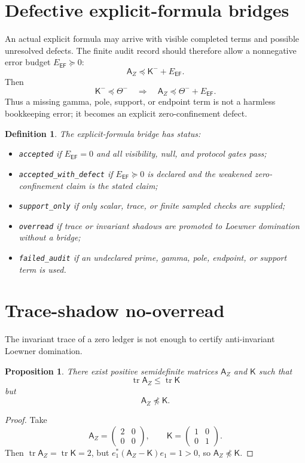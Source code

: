 \documentclass[11pt]{article}
\newtheorem{proposition}[theorem]{Proposition}
\newtheorem{definition}[theorem]{Definition}
\DeclareMathOperator{\tr}{tr}
\newcommand{\Kmat}{\mathsf K}
\newcommand{\AZ}{\mathsf A_Z}
\newcommand{\EF}{\mathsf{EF}}
\begin{document}
\section{Defective explicit-formula bridges}
An actual explicit formula may arrive with visible completed terms and possible unresolved defects.  The finite audit record should therefore allow a nonnegative error budget $E_{\EF}\succeq0$:
\[
  \AZ\preceq \Kmat^- + E_{\EF}.
\]
Then
\[
  \Kmat^-\preceq\Theta^-
  \quad\Longrightarrow\quad
  \AZ\preceq\Theta^-+E_{\EF}.
\]
Thus a missing gamma, pole, support, or endpoint term is not a harmless bookkeeping error; it becomes an explicit zero-confinement defect.

\begin{definition}
The explicit-formula bridge has status:
\begin{itemize}
  \item \texttt{accepted} if $E_{\EF}=0$ and all visibility, null, and protocol gates pass;
  \item \texttt{accepted\_with\_defect} if $E_{\EF}\succeq0$ is declared and the weakened zero-confinement claim is the stated claim;
  \item \texttt{support\_only} if only scalar, trace, or finite sampled checks are supplied;
  \item \texttt{overread} if trace or invariant shadows are promoted to Loewner domination without a bridge;
  \item \texttt{failed\_audit} if an undeclared prime, gamma, pole, endpoint, or support term is used.
\end{itemize}
\end{definition}

\section{Trace-shadow no-overread}
The invariant trace of a zero ledger is not enough to certify anti-invariant Loewner domination.

\begin{proposition}
There exist positive semidefinite matrices $\AZ$ and $\Kmat$ such that
\[
  \tr\AZ\le \tr\Kmat
\]
but
\[
  \AZ\npreceq \Kmat .
\]
\end{proposition}

\begin{proof}
Take
\[
  \AZ=\begin{pmatrix}2&0\\0&0\end{pmatrix},
  \qquad
  \Kmat=\begin{pmatrix}1&0\\0&1\end{pmatrix}.
\]
Then $\tr\AZ=\tr\Kmat=2$, but $e_1^*(\AZ-\Kmat)e_1=1>0$, so $\AZ\npreceq\Kmat$.
\end{proof}
\end{document}
